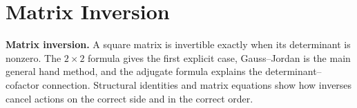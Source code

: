 \chapter{Matrix Inversion}








\noindent\textbf{Matrix inversion.} A square matrix is invertible exactly when its determinant is nonzero. The $2\times2$ formula gives the first explicit case, Gauss--Jordan is the main general hand method, and the adjugate formula explains the determinant--cofactor connection. Structural identities and matrix equations show how inverses cancel actions on the correct side and in the correct order.


